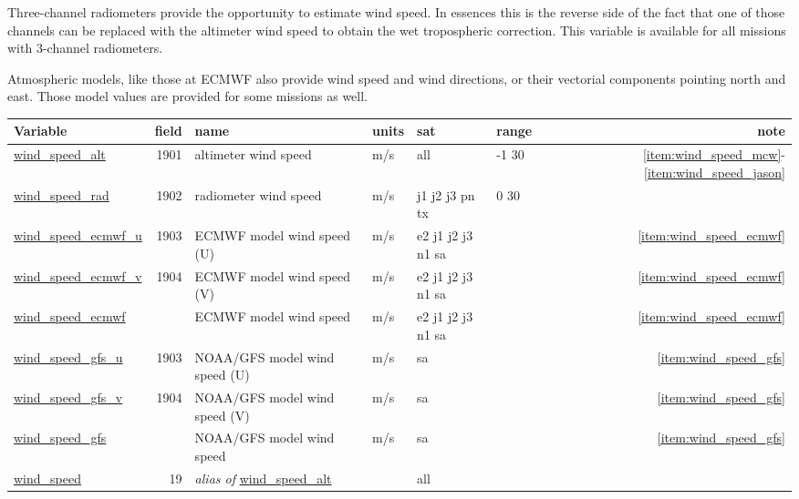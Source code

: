 \documentclass[a4paper,11pt,openany,natbib,nomargin]{thesis}
\makeatletter
\newcommand\var[1]{\url{#1}\index{variables!#1@\protect\url{#1}}}
\newcommand\alias[1]{\emph{alias of} \var{#1}}
\newenvironment{vartable}{
\begin{table}[ht]
\small
\begin{tabular}{lrllllr}
\hline
Variable & field & name & units & sat & range & note \\
\hline
}{
\hline
\end{tabular}
\end{table}
}
\makeatother
\begin{document}
Three-channel radiometers provide the opportunity to estimate wind speed. In essences this is the reverse side of the fact that one of those channels can be replaced with the altimeter wind speed to obtain the wet tropospheric correction. This variable is available for all missions with 3-channel radiometers.

Atmospheric models, like those at ECMWF also provide wind speed and wind directions, or their vectorial components pointing north and east. Those model values are provided for some missions as well.

\begin{vartable}
\var{wind_speed_alt} & 1901 & altimeter wind speed & m/s & all & -1 30 & \ref{item:wind_speed_mcw}-\ref{item:wind_speed_jason} \\
\var{wind_speed_rad} & 1902 & radiometer wind speed & m/s & j1 j2 j3 pn tx & 0 30 & \\
\var{wind_speed_ecmwf_u} & 1903 & ECMWF model wind speed (U) & m/s & e2 j1 j2 j3 n1 sa & & \ref{item:wind_speed_ecmwf} \\
\var{wind_speed_ecmwf_v} & 1904 & ECMWF model wind speed (V) & m/s & e2 j1 j2 j3 n1 sa & & \ref{item:wind_speed_ecmwf} \\
\var{wind_speed_ecmwf} & & ECMWF model wind speed & m/s & e2 j1 j2 j3 n1 sa & & \ref{item:wind_speed_ecmwf} \\
\var{wind_speed_gfs_u} & 1903 & NOAA/GFS model wind speed (U) & m/s & sa & & \ref{item:wind_speed_gfs} \\
\var{wind_speed_gfs_v} & 1904 & NOAA/GFS model wind speed (V) & m/s & sa & & \ref{item:wind_speed_gfs} \\
\var{wind_speed_gfs} & & NOAA/GFS model wind speed & m/s & sa & & \ref{item:wind_speed_gfs} \\
\hline
\var{wind_speed} & 19 & \alias{wind_speed_alt} && all && \\
\end{vartable}
\end{document}
